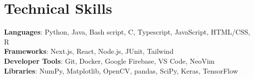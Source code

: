 \documentclass[letterpaper,11pt]{article}
\begin{document}
%
\section{Technical Skills}
 \begin{itemize}[leftmargin=0.15in, label={}]
    \small{\item{
     \textbf{Languages}{: Python, Java, Bash script, C, Typescript, JavaScript, HTML/CSS, R} \\
     \textbf{Frameworks}{: Next.js, React, Node.js, JUnit, Tailwind} \\
     \textbf{Developer Tools}{: Git, Docker, Google Firebase, VS Code, NeoVim} \\
     \textbf{Libraries}{: NumPy, Matplotlib, OpenCV, pandas, SciPy, Keras, TensorFlow}
    }}
 \end{itemize}


\end{document}
